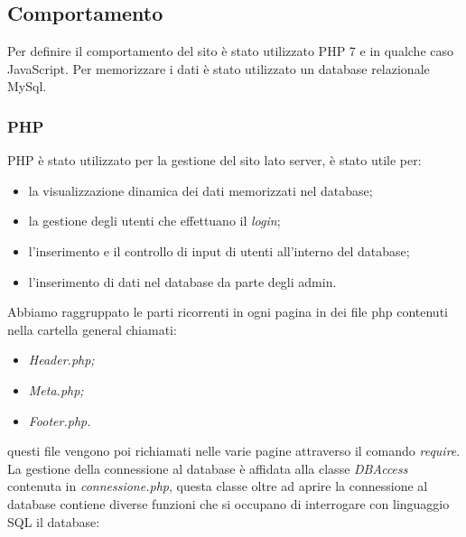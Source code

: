 \subsection{Comportamento}
Per definire il comportamento del sito è stato utilizzato PHP 7 e in qualche caso JavaScript. \newline
Per memorizzare i dati è stato utilizzato un database relazionale MySql.
\subsubsection{PHP}
PHP è stato utilizzato per la gestione del sito lato server, è stato utile per: 
\begin{itemize}
    \item la visualizzazione dinamica dei dati memorizzati nel database;
    \item la gestione degli utenti che effettuano il \emph{login};
    \item l'inserimento e il controllo di input di utenti all'interno del database;
    \item l'inserimento di dati nel database da parte degli admin.
\end{itemize}
Abbiamo raggruppato le parti ricorrenti in ogni pagina in dei file php contenuti nella cartella general chiamati:
\begin{itemize}
	\item \textit{Header.php;}
	\item \textit{Meta.php;}
	\item \textit{Footer.php.}
\end{itemize}
questi file vengono poi richiamati nelle varie pagine attraverso il comando \emph{require}.\newline
La gestione della connessione al database è affidata alla classe \emph{DBAccess} contenuta in \textit{connessione.php}, questa classe oltre ad aprire la connessione al database contiene diverse funzioni che si occupano di interrogare con linguaggio SQL il database:
